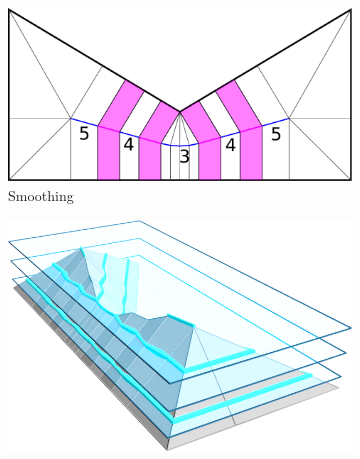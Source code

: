 \begin{figure}
\begin{subfigure}{\figwidth}
\includegraphics[width=\figheight]{sources/method/overview/2D/smoothed.pdf}
\caption{Smoothing}\label{3d_surface_overview_smoothed}
\end{subfigure}
\begin{subfigure}{\figwidth}\centering
\hspace*{\tempheightTwo}
\includegraphics[height=\figheight]{sources/method/overview/surface/sliced_cropped.png}

\vspace{\tempheight}


\end{subfigure}
\end{figure}
